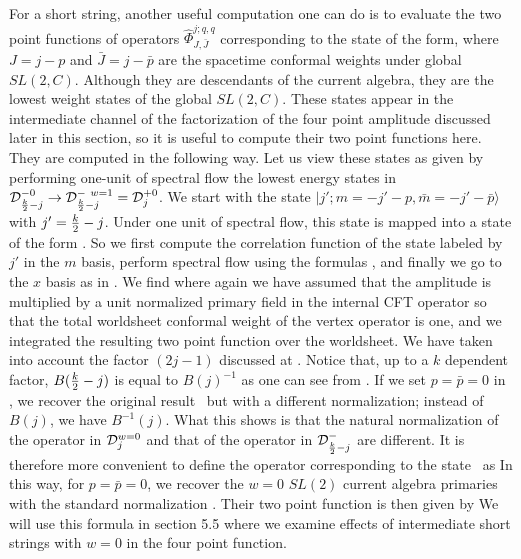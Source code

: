 For a short string,
another useful computation one can do is to evaluate
the two point functions of operators $\hat{\Phi}_{J, \bar J}^{j; q,q}$
corresponding to the state of the form,
\eqn{}
where $J = j -p$ and $\bar J = j- \bar p$ are the spacetime conformal
weights under global $SL(2,C)$. Although they are
descendants of the current algebra, they are the lowest weight
states of the global $SL(2,C)$. These states appear in the
intermediate channel of the factorization of the four point
amplitude discussed later in this section, so it is useful
to compute their two point functions here.
 They are computed in the following way.
Let us view these states as given by performing one-unit of
spectral flow the lowest
energy states in ${\cal D}_{{k \over 2} -j}^{-0} \to
{\cal D}_{{k \over 2} -j}^{- ~ w=1}= {\cal D}_{j}^{+0}$.
We start with the state $ |j'; m = -j'-p, {\bar m} = -j'-{\bar p}
\rangle$
with $j' = {k \over 2}  -j$.  Under one unit of spectral flow,
this state is mapped into a state of the form \statef .
 So we first compute the correlation
function of the state labeled by $j'$ in the $m$ basis, perform
spectral flow using the formulas \twoptfl , and finally  we go to the
$x$ basis as in \floweddis . We find
\eqn{}
where again we have assumed that the amplitude is multiplied by a unit
normalized primary field in the
internal CFT operator so that the total worldsheet conformal weight
of the vertex operator is one, and we integrated the
resulting two point function over the worldsheet.
We have taken into account the factor $(2j-1)$ discussed at
\twoptcorr. Notice that, up to a  $k$ dependent factor,
$B({k \over 2} -j)$ is equal to $B(j)^{-1} $ as one can see from  .
If we set $p=\bar p =0$ in \pretwoneg , we
recover the original result \twoptcorr\
but with a different normalization;
instead of $B(j)$, we have $B^{-1}(j)$.
What this shows is that the natural normalization of the operator in ${\cal
D}_j^{w=0}$ and that of the operator in ${\cal D}_{{k \over 2} - j}^-$
are different. It is therefore more convenient to
define the operator corresponding to the state \statef\ as
\eqn{}
In this way, for $p =\bar p =0$, we recover
the $w=0$ $SL(2)$ current algebra primaries with the standard
normalization  . Their two point function is then
given by
\eqn{}
We will use this formula in section 5.5 where we examine
effects of intermediate short strings with $w=0$
in the four point function.



